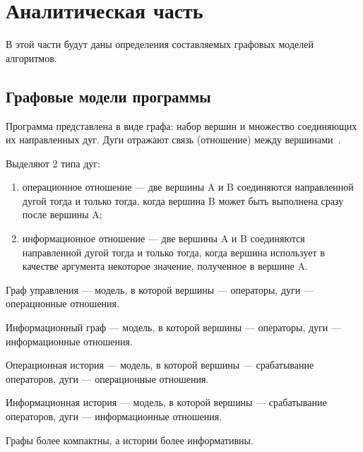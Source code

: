 \chapter{Аналитическая часть}
В этой части будут даны определения составляемых графовых моделей алгоритмов.

\section{Графовые модели программы}

Программа представлена в виде графа: набор вершин и множество соединяющих их направленных дуг.
Дуги отражают связь (отношение) между вершинами~\cite{graph}.

Выделяют 2 типа дуг:
\begin{enumerate}[label=\arabic*)]
	\item операционное отношение --- две вершины A и B соединяются направленной дугой тогда и только тогда, когда вершина B может быть выполнена сразу после вершины A;
	\item информационное отношение --- две вершины A и B соединяются направленной дугой тогда и только тогда, когда вершина использует в качестве аргумента некоторое значение, полученное в вершине A.
\end{enumerate}

Граф управления --- модель, в которой вершины --- операторы, дуги --- операционные отношения.

Информационный граф --- модель, в которой вершины --- операторы, дуги --- информационные отношения.

Операционная история --- модель, в которой вершины --- срабатывание операторов, дуги --- операционные отношения.

Информационная история --- модель, в которой вершины --- срабатывание операторов, дуги --- информационные отношения.

Графы более компактны, а истории более информативны. 
